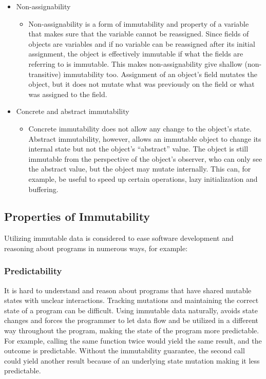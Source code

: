 \documentclass[12pt,twoside]{article}
\begin{document}
\begin{itemize}
\item Non-assignability
     \begin{itemize}
    \item[] Non-assignability is a form of immutability and property of a variable that makes sure that the variable cannot be reassigned. Since fields of objects are variables and if no variable can be reassigned after its initial assignment, the object is effectively immutable if what the fields are referring to is immutable. This makes non-assignability give shallow (non-transitive) immutability too. Assignment of an object’s field mutates the object, but it does not mutate what was previously on the field or what was assigned to the field.
\end{itemize}


\item Concrete and abstract immutability
     \begin{itemize}
    \item[] Concrete immutability does not allow any change to the object’s state. Abstract immutability, however, allows an immutable object to change its internal state but not the object’s “abstract” value. The object is still immutable from the perspective of the object’s observer, who can only see the abstract value, but the object may mutate internally. This can, for example, be useful to speed up certain operations, lazy initialization and buffering.
\end{itemize}


\end{itemize}

\subsection{Properties of Immutability}
Utilizing immutable data is considered to ease software development and reasoning about programs in
numerous ways, for example:

\subsubsection{Predictability} It is hard to understand and reason about programs that have shared mutable
states with unclear interactions. Tracking mutations and maintaining the correct state of a program
can be difficult. Using immutable data naturally, avoids state changes and forces the programmer
to let data flow and be utilized in a different way throughout the program, making the state of the
program more predictable. For example, calling the same function twice would yield the same result,
and the outcome is predictable. Without the immutability guarantee, the second call could
yield another result because of an underlying state mutation making it less predictable.
\end{document}
